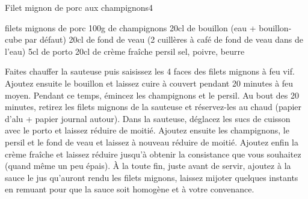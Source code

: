 \begin{recette}{Filet mignon de porc aux champignons}{4}{}{}
\begin{ingredients}
 filets mignons de porc
\ingredient 100g de champignons
\ingredient 20cl de bouillon (eau + bouillon-cube par défaut)
\ingredient 20cl de fond de veau (2 cuillères à café de fond de veau dans de l'eau)
\ingredient 5cl de porto
\ingredient 20cl de crème fraîche
\ingredient persil
\ingredient sel, poivre, beurre
\end{ingredients}

\begin{preparation}
\etape Faites chauffer la sauteuse puis saisissez les 4 faces des filets mignons à feu vif. Ajoutez ensuite le bouillon et laissez cuire à couvert pendant 20 minutes à feu moyen.
\etape Pendant ce temps, émincez les champignons et le persil.
\etape Au bout des 20 minutes, retirez les filets mignons de la sauteuse et réservez-les au chaud (papier d'alu + papier journal autour). Dans la sauteuse, déglacez les sucs de cuisson avec le porto et laissez réduire de moitié.
\etape Ajoutez ensuite les champignons, le persil et le fond de veau et laissez à nouveau réduire de moitié.
\etape Ajoutez enfin la crème fraîche et laissez réduire jusqu'à obtenir la consistance que vous souhaitez (quand même un peu épais).
\etape À la toute fin, juste avant de servir, ajoutez à la sauce le jus qu'auront rendu les filets mignons, laissez mijoter quelques instants en remuant pour que la sauce soit homogène et à votre convenance.
\end{preparation}

\end{recette}

